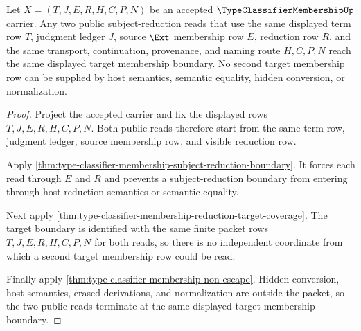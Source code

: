 \begin{theorem}
\label{thm:type-classifier-membership-visible-target-determinacy}
Let $X=(T,J,E,R,H,C,P,N)$ be an accepted $\TypeClassifierMembershipUp$ carrier. Any two public subject-reduction reads that use the same displayed term row $T$, judgment ledger $J$, source $\Ext$ membership row $E$, reduction row $R$, and the same transport, continuation, provenance, and naming route $H,C,P,N$ reach the same displayed target membership boundary. No second target membership row can be supplied by host semantics, semantic equality, hidden conversion, or normalization.
\end{theorem}
\begin{proof}
Project the accepted carrier and fix the displayed rows $T,J,E,R,H,C,P,N$. Both public reads therefore start from the same term row, judgment ledger, source membership row, and visible reduction row.

Apply \autoref{thm:type-classifier-membership-subject-reduction-boundary}. It forces each read through $E$ and $R$ and prevents a subject-reduction boundary from entering through host reduction semantics or semantic equality.

Next apply \autoref{thm:type-classifier-membership-reduction-target-coverage}. The target boundary is identified with the same finite packet rows $T,J,E,R,H,C,P,N$ for both reads, so there is no independent coordinate from which a second target membership row could be read.

Finally apply \autoref{thm:type-classifier-membership-non-escape}. Hidden conversion, host semantics, erased derivations, and normalization are outside the packet, so the two public reads terminate at the same displayed target membership boundary.
\end{proof}


